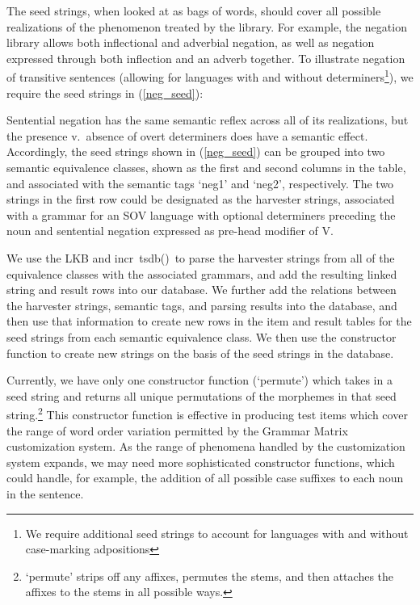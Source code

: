\documentclass[11pt]{article}
\newcommand{\itsdb}{\mbox{\sf \lbrack incr tsdb()\rbrack}}
\begin{document}
The seed strings, when looked at as bags of words, should cover all
possible realizations of the phenomenon treated by the library. For
example, the negation library allows both inflectional and adverbial
negation, as well as negation expressed through both inflection and an
adverb together.  To illustrate negation of transitive sentences
(allowing for languages with and without determiners\footnote{We
require additional seed strings to account for languages with and
without case-marking adpositions}), we require the seed strings in
(\ref{neg_seed}):

%
Sentential negation has the same semantic reflex across all
of its realizations, but the presence v.\ absence of overt determiners
does have a semantic effect.  Accordingly, the seed strings shown in
(\ref{neg_seed}) can be grouped into two semantic equivalence classes,
shown as the first and second columns in the table, and associated with
the semantic tags `neg1' and `neg2', respectively.  The two strings
in the first row could be designated as the harvester strings, associated
with a grammar for an SOV language with optional determiners preceding
the noun and sentential negation expressed as pre-head modifier of V.

We use the LKB and \itsdb\ to parse the harvester strings from all of
the equivalence classes with the associated grammars, and add the
resulting linked string and result rows into our database.  We further
add the relations between the harvester strings, semantic tags, and
parsing results into the database, and then use that information to
create new rows in the item and result tables for the seed strings
from each semantic equivalence class.  We then use the constructor
function to create new strings on the basis of the seed strings in the
database.

Currently, we have only one constructor function (`permute') which
takes in a seed string and returns all unique permutations of the
morphemes in that seed string.\footnote{`permute' strips off any
affixes, permutes the stems, and then attaches the affixes to the
stems in all possible ways.}  This constructor function is effective
in producing test items which cover the range of word order variation
permitted by the Grammar Matrix customization system.  As the range of
phenomena handled by the customization system expands, we may need
more sophisticated constructor functions, which could handle, for
example, the addition of all possible case suffixes to each noun
in the sentence.
\end{document}
